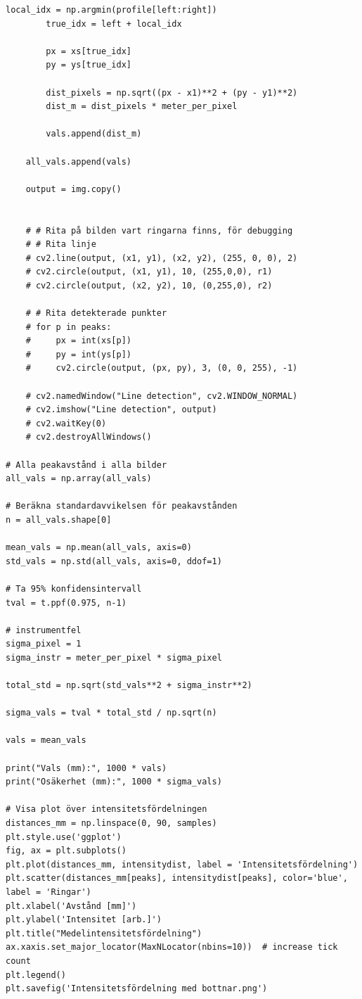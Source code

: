 \documentclass[12pt, a4paper]{article}
\begin{document}
\begin{lstlisting}[style=mypython, label={lst:dataanalys_Debye-Sherrer}]
        local_idx = np.argmin(profile[left:right])
        true_idx = left + local_idx

        px = xs[true_idx]
        py = ys[true_idx]

        dist_pixels = np.sqrt((px - x1)**2 + (py - y1)**2)
        dist_m = dist_pixels * meter_per_pixel

        vals.append(dist_m)

    all_vals.append(vals)

    output = img.copy()


    # # Rita på bilden vart ringarna finns, för debugging
    # # Rita linje
    # cv2.line(output, (x1, y1), (x2, y2), (255, 0, 0), 2)
    # cv2.circle(output, (x1, y1), 10, (255,0,0), r1)
    # cv2.circle(output, (x2, y2), 10, (0,255,0), r2)

    # # Rita detekterade punkter
    # for p in peaks:
    #     px = int(xs[p])
    #     py = int(ys[p])
    #     cv2.circle(output, (px, py), 3, (0, 0, 255), -1)

    # cv2.namedWindow("Line detection", cv2.WINDOW_NORMAL)
    # cv2.imshow("Line detection", output)
    # cv2.waitKey(0)
    # cv2.destroyAllWindows()

# Alla peakavstånd i alla bilder
all_vals = np.array(all_vals)

# Beräkna standardavvikelsen för peakavstånden
n = all_vals.shape[0]

mean_vals = np.mean(all_vals, axis=0)
std_vals = np.std(all_vals, axis=0, ddof=1)

# Ta 95% konfidensintervall
tval = t.ppf(0.975, n-1)

# instrumentfel
sigma_pixel = 1
sigma_instr = meter_per_pixel * sigma_pixel

total_std = np.sqrt(std_vals**2 + sigma_instr**2)

sigma_vals = tval * total_std / np.sqrt(n)

vals = mean_vals

print("Vals (mm):", 1000 * vals)
print("Osäkerhet (mm):", 1000 * sigma_vals)

# Visa plot över intensitetsfördelningen
distances_mm = np.linspace(0, 90, samples)
plt.style.use('ggplot')
fig, ax = plt.subplots()
plt.plot(distances_mm, intensitydist, label = 'Intensitetsfördelning')
plt.scatter(distances_mm[peaks], intensitydist[peaks], color='blue', label = 'Ringar')
plt.xlabel('Avstånd [mm]')
plt.ylabel('Intensitet [arb.]')
plt.title("Medelintensitetsfördelning")
ax.xaxis.set_major_locator(MaxNLocator(nbins=10))  # increase tick count
plt.legend()
plt.savefig('Intensitetsfördelning med bottnar.png')



\end{lstlisting}
\end{document}
